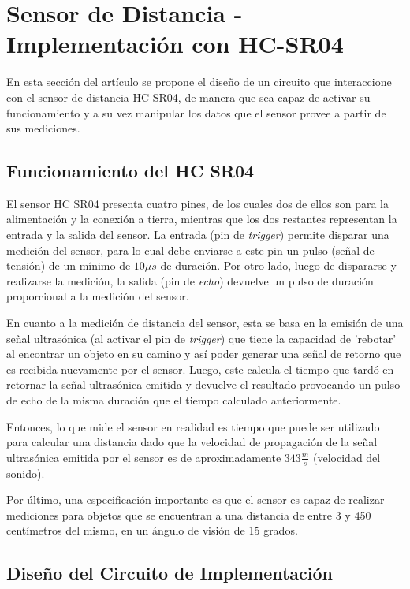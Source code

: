 \section{Sensor de Distancia - Implementación con HC-SR04}

En esta sección del artículo se propone el diseño de un circuito que
interaccione con el sensor de distancia HC-SR04, de manera que
sea capaz de activar su funcionamiento y a su vez manipular los datos
que el sensor provee a partir de sus mediciones. 

\subsection{Funcionamiento del HC SR04}

El sensor HC SR04 presenta cuatro pines, de los cuales dos de ellos
son para la alimentación y la conexión a tierra, mientras que los
dos restantes representan la entrada y la salida del sensor. La entrada
(pin de \textit{trigger}) permite disparar una medición del sensor, para
lo cual debe enviarse a este pin un pulso (señal de tensión) de un
mínimo de $10\mu s$ de duración. Por otro lado, luego de dispararse
y realizarse la medición, la salida (pin de \textit{echo}) devuelve un
pulso de duración proporcional a la medición del sensor.

En cuanto a la medición de distancia del sensor, esta se basa en la
emisión de una señal ultrasónica (al activar el pin de \textit{trigger})
que tiene la capacidad de 'rebotar' al encontrar un objeto en
su camino y así poder generar una señal de retorno que es recibida
nuevamente por el sensor. Luego, este calcula el tiempo que tardó
en retornar la señal ultrasónica emitida y devuelve el resultado
provocando un pulso de echo de la misma duración que el tiempo calculado
anteriormente.

Entonces, lo que mide el sensor en realidad es tiempo que puede ser
utilizado para calcular una distancia dado que la velocidad de propagación
de la señal ultrasónica emitida por el sensor es de aproximadamente
$343\frac{m}{s}$ (velocidad del sonido).

Por último, una especificación importante es que el sensor es capaz
de realizar mediciones para objetos que se encuentran a una distancia
de entre 3 y 450 centímetros del mismo, en un ángulo de visión de
15 grados.

\subsection{Diseño del Circuito de Implementación}

